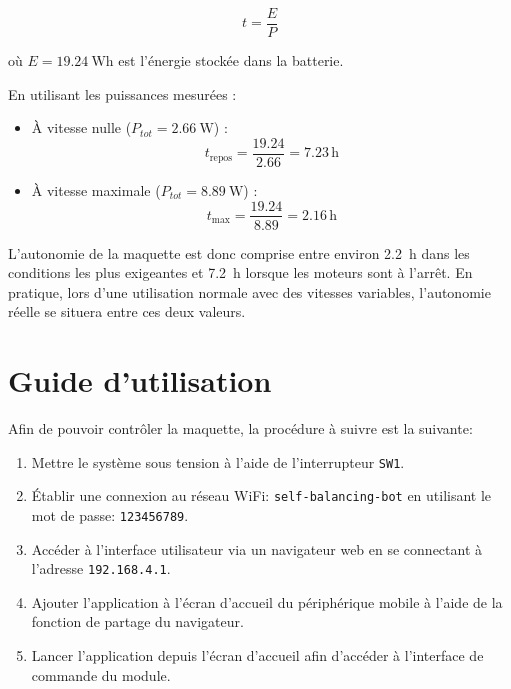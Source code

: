 \begin{equation}
    t = \frac{E}{P}
\end{equation}

où \(E=\SI{19.24}{\watt\hour}\) est l'énergie stockée dans la batterie.

En utilisant les puissances mesurées :

\begin{itemize}
    \item À vitesse nulle (\(P_{tot}=\SI{2.66}{\watt}\)) :
    \begin{equation}
        t_{\text{repos}}=\frac{19.24}{2.66}=7.23\,\si{\hour}
    \end{equation}

    \item À vitesse maximale (\(P_{tot}=\SI{8.89}{\watt}\)) :
    \begin{equation}
        t_{\text{max}}=\frac{19.24}{8.89}=2.16\,\si{\hour}
    \end{equation}
\end{itemize}

L'autonomie de la maquette est donc comprise entre environ \SI{2.2}{\hour} dans les conditions les plus exigeantes et \SI{7.2}{\hour} lorsque les moteurs sont à l'arrêt. En pratique, lors d'une utilisation normale avec des vitesses variables, l'autonomie réelle se situera entre ces deux valeurs.

\section{Guide d'utilisation}
Afin de pouvoir contrôler la maquette, la procédure à suivre est la suivante:
\begin{enumerate}
    \item Mettre le système sous tension à l'aide de l'interrupteur \texttt{SW1}.
    \item Établir une connexion au réseau WiFi: \texttt{self-balancing-bot} en utilisant le mot de passe: \texttt{123456789}.
    \item Accéder à l'interface utilisateur via un navigateur web en se connectant à l'adresse \texttt{192.168.4.1}.
    \item Ajouter l'application à l'écran d'accueil du périphérique mobile à l'aide de la fonction de partage du navigateur.
    \item Lancer l'application depuis l'écran d'accueil afin d'accéder à l'interface de commande du module.
\end{enumerate}

